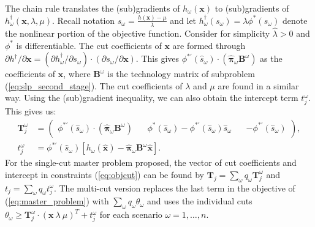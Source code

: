 \documentclass[opre,nonblindrev]{informs3} %
\newcommand{\x}{\mathbf{x}}
\newcommand{\xh}{\hat{\x}}
\newcommand{\lh}{\hat{\lambda}}
\newcommand{\mh}{\hat{\mu}}
\newcommand{\bpi}{\mathbf{\pi}}
\newcommand{\bpih}{\hat{\bpi}}
\newcommand{\B}{\mathbf{B}}
\newcommand{\T}{\mathbf{T}}
\newcommand{\plp}{$\phi$LP-2}
\begin{document}
The chain rule translates the (sub)gradients of $h_\omega(\x)$ to (sub)gradients of $h^{\dagger}_\omega(\x,\lambda,\mu)$. 
Recall notation $s_\omega = \frac{h(\x)-\mu}{\lambda}$ and let $h^\dagger_\omega(s_\omega) = \lambda \phi^*\left(s_\omega \right)$ denote the nonlinear portion of the objective function. 
Consider for simplicity $\hat{\lambda} > 0$ and $\phi^*$ is differentiable.
The cut coefficients of $\x$ are formed through $\partial h^\dagger / \partial \x = (\partial h^\dagger_\omega/\partial s_\omega) \cdot (\partial s_\omega/\partial \x)$. 
This gives $\phi^{* \prime}(\hat{s}_\omega)\cdot(\bpih_\omega \B^\omega)$ as the coefficients of $\x$, where $\B^\omega$ is the technology matrix of subproblem (\ref{eq:slp_second_stage}). 
The cut coefficients of $\lambda$ and $\mu$ are found in a similar way. 
Using the (sub)gradient inequality, we can also obtain the intercept term $t_j^\omega$. 
This gives us:
\begin{align*}
	\T_j^\omega & = 
	\left( \begin{array}{ccc}
		\phi^{*\prime}(\hat{s}_\omega) \cdot (\bpih_\omega \B^\omega) \ \ \ \  
			 & \phi^*(\hat{s}_\omega) - \phi^{*\prime}(\hat{s}_\omega) \hat{s}_\omega \ \ \ \ 
			 & -\phi^{*\prime}(\hat{s}_\omega)
	\end{array} \right), \\
	t_j^\omega & =  \phi^{*\prime}(\hat{s}_\omega)\left[ h_\omega(\xh) - \bpih_\omega \B^\omega \xh \right].
\end{align*}
For the single-cut master problem proposed, the vector of cut coefficients and intercept in constraints (\ref{eq:objcut}) can be found by
 $\T_j = \sum_{\omega} q_\omega \T_j^\omega$ and $t_j = \sum_\omega q_\omega t_j^\omega$. 
The multi-cut version replaces the last term in the objective of (\ref{eq:master_problem}) with $\sum_\omega q_\omega \theta_\omega$ and uses the individual cuts $\theta_\omega \geq \T_j^\omega \cdot (\x\  \lambda\ \mu)^{T} + t_j^\omega$ for each scenario $\omega = 1, \ldots, n$. 
\end{document}
